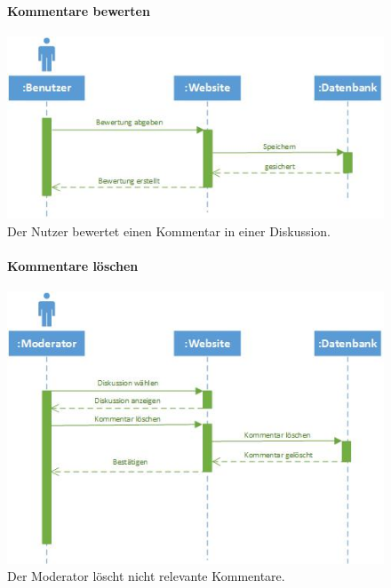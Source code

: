 \documentclass[12pt,a4paper]{article}
\begin{document}
\begin{figure}[H]
	\centering
	\paragraph{Kommentare bewerten}
	\includegraphics[width=\textwidth]{Bilder/Sequenzdiagramme/KommentareBewerten1.jpg}
	\caption{Der Nutzer bewertet einen Kommentar in einer Diskussion.}
	\label{SzKommentareBewerten}
\end{figure}
\begin{figure}[H]
	\centering
	\paragraph{Kommentare löschen}
	\includegraphics[width=\textwidth]{Bilder/Sequenzdiagramme/KommentareLoeschen1.jpg}
	\caption{Der Moderator löscht nicht relevante Kommentare.}
	\label{SzKommentarLoeschen}
\end{figure}
\end{document}
